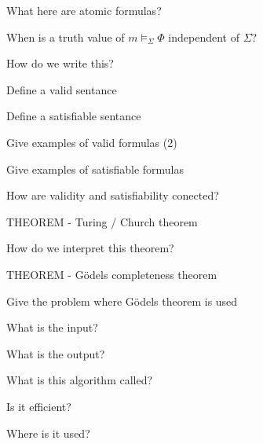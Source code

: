 \documentclass[fleqn]{article}
\begin{document}
\begin{enumerate}
\begin{itemize}
    \end{itemize}
    \item What here are atomic formulas?
    \item When is a truth value of $m \models_{\Sigma} \Phi$ independent of $\Sigma$?
    \item How do we write this?
    {\color{red}\item Define a valid sentance}
    \item Define a satisfiable sentance
    {\color{red}\item Give examples of valid formulas (2)}
    {\color{red}\item Give examples of satisfiable formulas}
    \item How are validity and satisfiability conected?
    {\color{red}\item THEOREM - Turing / Church theorem}
    {\color{red}\item How do we interpret this theorem?}
    {\color{red}\item THEOREM  - Gödels completeness theorem}
    {\color{red}\item Give the problem where Gödels theorem is used}
    \begin{itemize}
        {\color{blue}\item What is the input?}
        {\color{red}\item What is the output?}
        {\color{red}\item What is this algorithm called?}
        {\color{red}\item Is it efficient?}
        {\color{red}\item Where is it used?}
    \end{itemize}
\end{enumerate}
\end{document}
